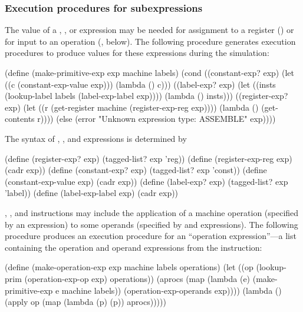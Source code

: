 \subsubsection*{Execution procedures for subexpressions}

The value of a , , or  expression may be
needed for assignment to a register () or for input to an
operation (, below).  The following procedure
generates execution procedures to produce values for these expressions during
the simulation:

\begin{codeBlock}
(define (make-primitive-exp exp machine labels)
  (cond ((constant-exp? exp)
         (let ((c (constant-exp-value exp)))
           (lambda () c)))
        ((label-exp? exp)
         (let ((insts (lookup-label
                        labels
                        (label-exp-label exp))))
           (lambda () insts)))
        ((register-exp? exp)
         (let ((r
                 (get-register
                   machine
                   (register-exp-reg exp))))
           (lambda () (get-contents r))))
        (else
          (error
            "Unknown expression type: ASSEMBLE"
            exp))))
\end{codeBlock}

\noindent
The syntax of , , and  expressions is
determined by

\begin{codeBlock}
(define (register-exp? exp) (tagged-list? exp 'reg))
(define (register-exp-reg exp) (cadr exp))
(define (constant-exp? exp) (tagged-list? exp 'const))
(define (constant-exp-value exp) (cadr exp))
(define (label-exp? exp) (tagged-list? exp 'label))
(define (label-exp-label exp) (cadr exp))
\end{codeBlock}

\noindent
{}, , and  instructions may include the
application of a machine operation (specified by an  expression) to
some operands (specified by  and  expressions).  The
following procedure produces an execution procedure for an ``operation
expression''---a list containing the operation and operand expressions from the
instruction:

\begin{codeBlock}
(define (make-operation-exp exp
                            machine
                            labels
                            operations)
  (let ((op (lookup-prim (operation-exp-op exp)
                         operations))
        (aprocs
          (map (lambda (e)
                 (make-primitive-exp e
                                     machine
                                     labels))
               (operation-exp-operands exp))))
    (lambda ()
      (apply op (map (lambda (p) (p)) aprocs)))))
\end{codeBlock}

